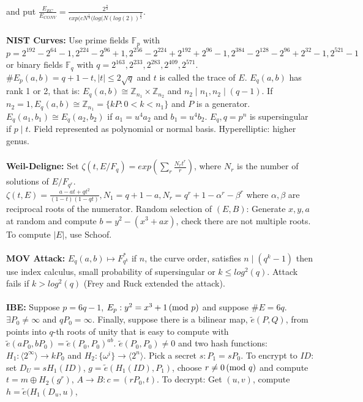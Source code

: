 and put 
${\frac {E_{EC}} {E_{CONV}}}= 
{\frac {2^{\frac n 2}} {exp (c N^{\frac 1 3}(log(N (log(2))^{\frac 2 3}}}$.
\\
\\
{\bf NIST Curves:} Use prime fields ${\mathbb F}_p$ with $p=
2^{192}-2^{ 64}-1,
2^{224}-2^{ 96}+1,
2^{256}-2^{224}+ 2^{192}+2^{96}-1,
2^{384}-2^{128}- 2^{96}+2^{32}-1,
2^{521}-1$ or  binary fields ${\mathbb F}_{q}$ with $q=
2^{163}, 2^{233}, 2^{283}, 2^{409}, 2^{571}$.  $\#E_p(a,b)=q+1-t, |t| \le 2 {\sqrt q}$ and
$t$ is called the trace of $E$.  $E_q(a,b)$ has rank 1 or 2, that is:
$E_q(a,b) \cong {\mathbb Z}_{n_1} \times {\mathbb Z}_{n_2}$ and $n_2 \mid n_1, n_2 \mid (q-1)$.
If $n_2=1, E_q(a,b) \cong {\mathbb Z}_{n_1}= \{kP: 0<k<n_1 \}$ and $P$ is a generator.
$E_q(a_1, b_1) \cong E_q(a_2, b_2)$ if 
$a_1= u^4 a_2$ and $b_1= u^4 b_2$.  $E_q, q= p^n$ is supersingular if $p \mid t$.  Field
represented as polynomial or normal basis.  Hyperelliptic: higher genus.
\\
\\
{\bf Weil-Deligne:}
Set $\zeta(t,E/F_q)= exp(\sum_r {\frac {N_r t^r} r})$, where $N_r$ is the
number of solutions of $E/F_{q^r}$.  $\zeta(t,E)= {\frac {a-at+qt^2} {(1-t)(1-qt)}},
N_1=q+1-a, N_r= q^r +1 - \alpha^r - \beta^r$ where $\alpha, \beta$ are reciprocal roots
of the numerator.  Random selection of $(E,B)$:  Generate $x,y,a$ at random and compute
$b= y^2-(x^3+ax)$, check there are not multiple roots.  To compute $|E|$,
use Schoof.
\\
\\
{\bf MOV Attack:} $E_q(a,b) \mapsto F^*_{q^k}$ if $n$, the curve order, satisfies
$n \mid (q^k-1)$ then use index calculus, small probability of supersingular or
$k \le log^2(q)$.  Attack fails if $k>log^2(q)$ (Frey and Ruck extended the attack).
\\
\\
{\bf IBE:} Suppose $p=6q-1$, $E_p: y^2 = x^3 + 1 \thinspace \textnormal{(mod } p \textnormal{)}$ and suppose $\#E= 6q$.
$\exists P_0 \ne \infty$ and
$qP_0 = \infty$.  Finally, suppose there is a bilinear map,
${\tilde {e}}(P,Q)$, from points into $q$-th
roots of unity that is easy to compute with
$\tilde {e}(aP_0,bP_0)= \tilde {e}(P_0, P_0)^{ab}$.
$\tilde{e}(P_0 , P_0) \ne 0$ and two hash functions: 
$H_1: \langle 2^{\infty} \rangle \rightarrow kP_0$
and $H_2: \{\omega^i\} \rightarrow \langle 2^n \rangle$.  
Pick a secret $s: P_1=sP_0$.  To encrypt
to $ID$: set $D_U= sH_1(ID)$, $g= \tilde {e}(H_1(ID), P_1)$,
choose $r \ne 0 \thinspace \textnormal{(mod } q \textnormal{)}$ and compute $t= m \oplus H_2(g^r)$, $A \rightarrow B:
c=(r P_0 , t)$.  To decrypt:  Get $(u,v)$, compute $h= \tilde {e} (H_1(D_u, u)$,
